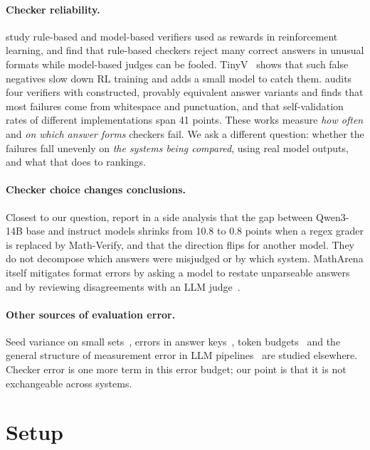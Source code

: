\documentclass[11pt]{article}
\begin{document}
\paragraph{Checker reliability.}
\citet{huang2025verifiers} study rule-based and model-based verifiers used as rewards in reinforcement learning, and find that rule-based checkers reject many correct answers in unusual formats while model-based judges can be fooled.
TinyV~\citep{xu2025tinyv} shows that such false negatives slow down RL training and adds a small model to catch them.
\citet{xin2026verifier} audits four verifiers with constructed, provably equivalent answer variants and finds that most failures come from whitespace and punctuation, and that self-validation rates of different implementations span 41 points.
These works measure \emph{how often} and \emph{on which answer forms} checkers fail. We ask a different question: whether the failures fall unevenly on \emph{the systems being compared}, using real model outputs, and what that does to rankings.

\paragraph{Checker choice changes conclusions.}
Closest to our question, \citet{munjal2026instruct} report in a side analysis that the gap between Qwen3-14B base and instruct models shrinks from 10.8 to 0.8 points when a regex grader is replaced by Math-Verify, and that the direction flips for another model. They do not decompose which answers were misjudged or by which system.
MathArena itself mitigates format errors by asking a model to restate unparseable answers and by reviewing disagreements with an LLM judge~\citep{dekoninck2026platform}.

\paragraph{Other sources of evaluation error.}
Seed variance on small sets~\citep{hochlehnert2025sober}, errors in answer keys~\citep{vendrow2025reliability}, token budgets~\citep{desouza2026budget} and the general structure of measurement error in LLM pipelines~\citep{messing2026hidden} are studied elsewhere. Checker error is one more term in this error budget; our point is that it is not exchangeable across systems.

\section{Setup}\label{sec:setup}
\end{document}
